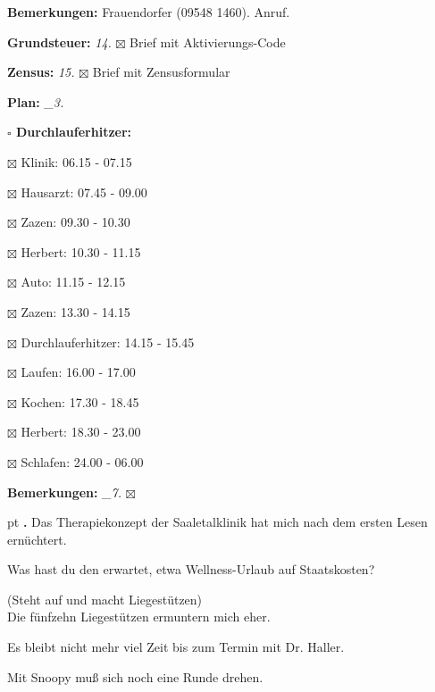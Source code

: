 \documentclass[10pt,a4paper]{article}
\newcounter{notec}
\newcommand\notep[1]{%
  \stepcounter{notec}
  \vskip #1pt
  {\bf\arabic{notec}.}
}
\newcommand\prop[1] {{\color {alizarin} {\bf #1}}}        %
\newcommand\opti[1] {{\color {amethyst} {\bf #1}}}        %
\newcommand\mand[1] {{\color {burntorange} {\bf #1}}}     %
\newcommand\topspace{\vskip -15pt \hskip 20pt}
\newcommand\bottomspace{\vskip 4pt}
\newcommand\n[1] { {\sl #1.} \hskip 5pt }
\begin{document}
\begin{mdframed}[style=daystyle]
\begin{labeling}{{\mand {Bemerkungen:}}}
      Frauendorfer (09548 1460). Anruf.
  \item[{\opti {Grundsteuer:}}]    \n{14} $\boxtimes$ Brief mit Aktivierungs-Code
  \item[{\opti {Zensus:}}]    \n{15} $\boxtimes$ Brief mit Zensusformular
  \item[{\mand {Plan:}}]          \n{\_3}
    \topspace
    \begin{minipage}{0.75\textwidth}  
      \begin{labeling}{\prop {$\square$ {Durchlauferhitzer:}}} 
        \setlength\itemsep{-3pt}
      \item[$\boxtimes$ Klinik:]            06.15 - 07.15
      \item[$\boxtimes$ Hausarzt:]          07.45 - 09.00
      \item[$\boxtimes$ Zazen:]             09.30 - 10.30
      \item[$\boxtimes$ Herbert:]           10.30 - 11.15
      \item[$\boxtimes$ Auto:]              11.15 - 12.15
      \item[$\boxtimes$ Zazen:]             13.30 - 14.15
      \item[$\boxtimes$ Durchlauferhitzer:] 14.15 - 15.45        
      \item[$\boxtimes$ Laufen:]            16.00 - 17.00
      \item[$\boxtimes$ Kochen:]            17.30 - 18.45
      \item[$\boxtimes$ Herbert:]           18.30 - 23.00
      \item[$\boxtimes$ Schlafen:]          24.00 - 06.00
      \end{labeling}
    \end{minipage}
    \bottomspace
  \item[{\mand {Bemerkungen:}}]   \n{\_7} $\boxtimes$
  \end{labeling}
    
  \setcounter{notec}{0}

  \notep 0 Das Therapiekonzept der Saaletalklinik hat mich nach dem ersten Lesen
  ernüchtert.

  \vskip 2pt
  Was hast du den erwartet, etwa Wellness-Urlaub auf Staatskosten?

  \vskip 2pt  
  (Steht auf und macht Liegestützen) \\
  Die fünfzehn Liegestützen ermuntern mich eher.

  \vskip 2pt
  Es bleibt nicht mehr viel Zeit bis zum Termin mit Dr. Haller.

  \vskip 2pt
  Mit Snoopy muß sich noch eine Runde drehen.
  
\end{mdframed}
\end{document}

